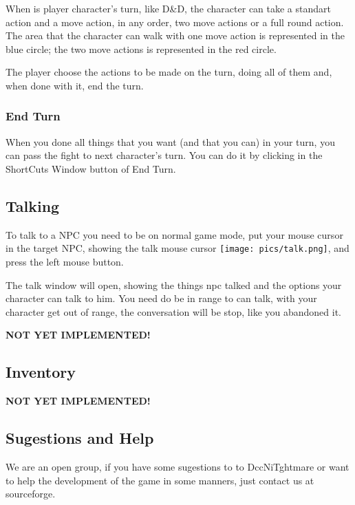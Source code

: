 \documentclass[ letterpaper,12pt]{article}
\begin{document}
When is player character's turn, like D\&D, the character can take a standart action and a move action, in any order, two move actions or a full round action. The area that the character can walk with one move action is represented in the blue circle; the two move actions is represented in the red circle.

The player choose the actions to be made on the turn, doing all of them and, when done with it, end the turn.

\subsubsection{End Turn}

When you done all things that you want (and that you can) in your turn, you can pass the fight to next character's turn. You can do it by clicking in the ShortCuts Window button of End Turn.

\subsection{Talking}

To talk to a NPC you need to be on normal game mode, put your mouse cursor in the target NPC, showing the talk mouse cursor \texttt{[image: pics/talk.png]}, and press the left mouse button.

The talk window will open, showing the things npc talked and the options your character can talk to him. You need do be in range to can talk, with your character get out of range, the conversation will be stop, like you abandoned it.

{\bf NOT YET IMPLEMENTED!}

\subsection{Inventory}

{\bf NOT YET IMPLEMENTED!}

\subsection{Sugestions and Help}

We are an open group, if you have some sugestions to to DccNiTghtmare or want to help the development of the game in some manners, just contact us at sourceforge.
\end{document}
